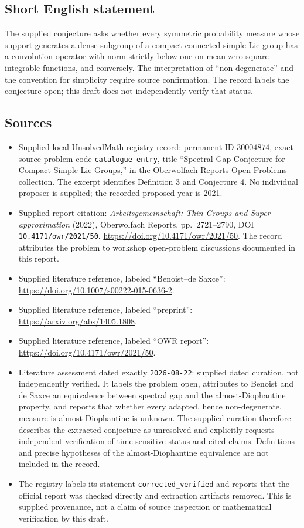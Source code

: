 \documentclass[11pt]{article}
\begin{document}
\subsection{Short English statement}
The supplied conjecture asks whether every symmetric probability measure whose support generates a dense subgroup of a compact connected simple Lie group has a convolution operator with norm strictly below one on mean-zero square-integrable functions, and conversely. The interpretation of ``non-degenerate'' and the convention for simplicity require source confirmation. The record labels the conjecture open; this draft does not independently verify that status.
\subsection{Sources}
\begin{itemize}
\item Supplied local UnsolvedMath registry record: permanent ID \(30004874\), exact source problem code \texttt{catalogue entry}, title ``Spectral-Gap Conjecture for Compact Simple Lie Groups,'' in the Oberwolfach Reports Open Problems collection. The excerpt identifies Definition 3 and Conjecture 4. No individual proposer is supplied; the recorded proposed year is 2021.
\item Supplied report citation: \emph{Arbeitsgemeinschaft: Thin Groups and Super-approximation} (2022), Oberwolfach Reports, pp.\ 2721--2790, DOI \texttt{10.4171/owr/2021/50}. \url{https://doi.org/10.4171/owr/2021/50}. The record attributes the problem to workshop open-problem discussions documented in this report.
\item Supplied literature reference, labeled ``Benoist--de Saxce'': \url{https://doi.org/10.1007/s00222-015-0636-2}.
\item Supplied literature reference, labeled ``preprint'': \url{https://arxiv.org/abs/1405.1808}.
\item Supplied literature reference, labeled ``OWR report'': \url{https://doi.org/10.4171/owr/2021/50}.
\item Literature assessment dated exactly \texttt{2026-08-22}: supplied dated curation, not independently verified. It labels the problem open, attributes to Benoist and de Saxce an equivalence between spectral gap and the almost-Diophantine property, and reports that whether every adapted, hence non-degenerate, measure is almost Diophantine is unknown. The supplied curation therefore describes the extracted conjecture as unresolved and explicitly requests independent verification of time-sensitive status and cited claims. Definitions and precise hypotheses of the almost-Diophantine equivalence are not included in the record.
\item The registry labels its statement \texttt{corrected\_verified} and reports that the official report was checked directly and extraction artifacts removed. This is supplied provenance, not a claim of source inspection or mathematical verification by this draft.
\end{itemize}
\end{document}
